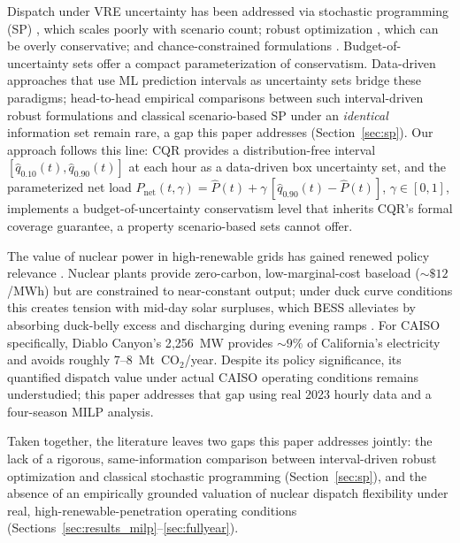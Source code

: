 \documentclass[preprint,12pt,authoryear]{elsarticle}
\begin{document}
Dispatch under VRE uncertainty has been addressed via stochastic programming (SP) \citep{birge2011,papavasiliou2011}, which scales poorly with scenario count; robust optimization \citep{bertsimas2013}, which can be overly conservative; and chance-constrained formulations \citep{bienstock2014}. Budget-of-uncertainty sets \citep{bertsimas2004} offer a compact parameterization of conservatism. Data-driven approaches that use ML prediction intervals as uncertainty sets \citep{dvorkin2019} bridge these paradigms; head-to-head empirical comparisons between such interval-driven robust formulations and classical scenario-based SP under an \emph{identical} information set remain rare, a gap this paper addresses (Section~\ref{sec:sp}). Our approach follows this line: CQR provides a distribution-free interval $[\hat{q}_{0.10}(t), \hat{q}_{0.90}(t)]$ at each hour as a data-driven box uncertainty set, and the parameterized net load $P_{\text{net}}(t,\gamma) = \hat{P}(t) + \gamma\,[\hat{q}_{0.90}(t) - \hat{P}(t)]$, $\gamma \in [0,1]$, implements a budget-of-uncertainty conservatism level that inherits CQR's formal coverage guarantee, a property scenario-based sets cannot offer.

The value of nuclear power in high-renewable grids has gained renewed policy relevance \citep{jenkins2018,sepulveda2018,cany2018,bistline2023}. Nuclear plants provide zero-carbon, low-marginal-cost baseload (${\sim}\$12$/MWh) but are constrained to near-constant output; under duck curve conditions this creates tension with mid-day solar surpluses, which BESS alleviates by absorbing duck-belly excess and discharging during evening ramps \citep{denholm2022b,sioshansi2009}. For CAISO specifically, Diablo Canyon's 2{,}256~MW provides ${\sim}9\%$ of California's electricity and avoids roughly 7--8~Mt~CO$_2$/year. Despite its policy significance, its quantified dispatch value under actual CAISO operating conditions remains understudied; this paper addresses that gap using real 2023 hourly data and a four-season MILP analysis.

Taken together, the literature leaves two gaps this paper addresses jointly: the lack of a rigorous, same-information comparison between interval-driven robust optimization and classical stochastic programming (Section~\ref{sec:sp}), and the absence of an empirically grounded valuation of nuclear dispatch flexibility under real, high-renewable-penetration operating conditions (Sections~\ref{sec:results_milp}--\ref{sec:fullyear}).


\end{document}
